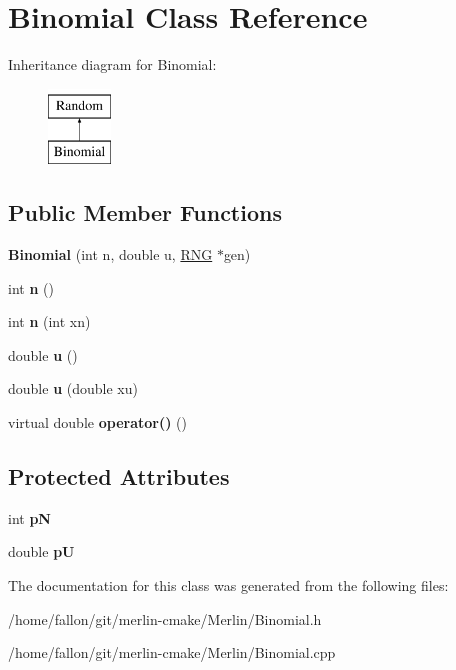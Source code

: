 \hypertarget{classBinomial}{}\section{Binomial Class Reference}
\label{classBinomial}
Inheritance diagram for Binomial\+:\begin{figure}[H]
\begin{center}
\leavevmode
\includegraphics[height=2.000000cm]{classBinomial}
\end{center}
\end{figure}
\subsection*{Public Member Functions}
\begin{DoxyCompactItemize}
\item 
\mbox{\label{classBinomial_a428350f0a46f32c41f695e63a46ffa94}} 
{\bfseries Binomial} (int n, double u, \hyperlink{classRNG}{R\+NG} $\ast$gen)
\item 
\mbox{\label{classBinomial_a022822b08181402387ac3a8f4fce35db}} 
int {\bfseries n} ()
\item 
\mbox{\label{classBinomial_a01acca773a5bdb3e468d78e19a946b24}} 
int {\bfseries n} (int xn)
\item 
\mbox{\label{classBinomial_aa43457c0e0e177c619894425bbcb9879}} 
double {\bfseries u} ()
\item 
\mbox{\label{classBinomial_a4fadb644ba8ddae03657401da11b5e81}} 
double {\bfseries u} (double xu)
\item 
\mbox{\label{classBinomial_afa2e867ce22cf0b78b624de7a8f44291}} 
virtual double {\bfseries operator()} ()
\end{DoxyCompactItemize}
\subsection*{Protected Attributes}
\begin{DoxyCompactItemize}
\item 
\mbox{\label{classBinomial_a7b043cf18cd7a22f4bbadd5a94932c8f}} 
int {\bfseries pN}
\item 
\mbox{\label{classBinomial_ae4dd874e53dde7f2041e13a1bf356447}} 
double {\bfseries pU}
\end{DoxyCompactItemize}


The documentation for this class was generated from the following files\+:\begin{DoxyCompactItemize}
\item 
/home/fallon/git/merlin-\/cmake/\+Merlin/Binomial.\+h\item 
/home/fallon/git/merlin-\/cmake/\+Merlin/Binomial.\+cpp\end{DoxyCompactItemize}
